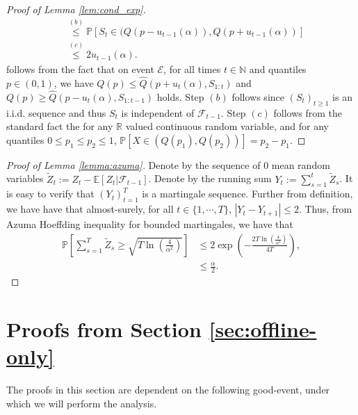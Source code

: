 \begin{proof}[Proof of Lemma \ref{lem:cond_exp}]
\begin{align*}
        &\stackrel{(b)}{\leq}  \mathbb{P}[S_t \in (Q(p-u_{t-1}(\alpha)), Q(p+u_{t-1}(\alpha)) ]  \\
    & \stackrel{(c)}{\leq} 2u_{t-1}(\alpha).
\end{align*}
follows from the fact that on event $\mathcal{E}$, for all times $t \in \mathbb{N}$ and quantiles $p \in (0,1)$, we have $Q(p) \leq \widehat{Q}(p+u_t(\alpha),S_{1:t})$ and $Q(p) \geq \widehat{Q}(p-u_t(\alpha),S_{1:t-1})$ holds. Step $(b)$ follows since $(S_t)_{t \geq 1}$ is an i.i.d. sequence and thus $S_t$ is independent of $\mathcal{F}_{t-1}$. Step $(c)$ follows from the standard fact the for any $\mathbb{R}$ valued continuous random variable, and for any quantiles $0 \leq p_1 \leq p_2 \leq 1 $, $\mathbb{P}[X \in (Q(p_1), Q(p_2))] = p_2 - p_1$.
\end{proof}

\begin{proof}[Proof of Lemma \ref{lemma:azuma}]
Denote by the sequence of $0$ mean random variables $\widetilde{Z}_t := Z_t - \mathbb{E}[Z_t \vert \mathcal{F}_{t-1}]$. Denote by the running sum $Y_t := \sum_{s=1}^{t} \widetilde{Z}_s$. It is easy to verify that $(Y_t)_{t=1}^T$ is a martingale sequence. Further from definition, we have have that almost-surely, for all $t \in \{1,\cdots, T\}$, $|Y_{t} - Y_{t+1}| \leq 2$. Thus, from Azuma Hoeffding inequality for bounded martingales, we have that 
\begin{align}
    \mathbb{P}\left[\sum_{s=1}^T \widetilde{Z}_s \geq \sqrt{T \ln \left( \frac{4}{\alpha^2} \right)}\right] &\leq 2 \exp \left( - \frac{2 T \ln \left( \frac{4}{\alpha^2} \right)}{4T} \right), \\
    &\leq \frac{\alpha}{2}.
\end{align}


\end{proof}

\section{Proofs from Section \ref{sec:offline-only}}



The proofs in this section are dependent on the following good-event, under which we will perform the analysis.



